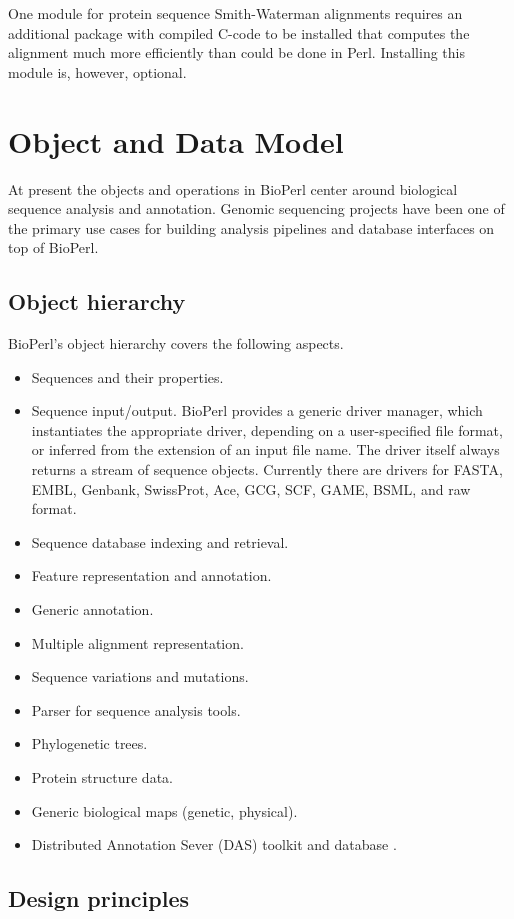 \documentclass{article}
\begin{document}
\begin{twocolumn}
One module for protein sequence Smith-Waterman alignments requires an
additional package with compiled C-code to be installed that computes
the alignment much more efficiently than could be done in
Perl.  Installing this module is, however, optional.

\section{Object and Data Model}

At present the objects and operations in BioPerl center around
biological sequence analysis and annotation.  Genomic sequencing
projects have been one of the primary use cases for building analysis
pipelines and database interfaces on top of BioPerl. 

\subsection{Object hierarchy}

BioPerl's object hierarchy covers the following aspects.
\begin{itemize}
\item Sequences and their properties.
\item Sequence input/output.  BioPerl provides a generic driver
manager, which instantiates the appropriate driver, depending on a
user-specified file format, or inferred from the extension of an input
file name.  The driver itself always returns a stream of sequence
objects.  Currently there are drivers for FASTA, EMBL, Genbank, SwissProt,
Ace, GCG, SCF, GAME, BSML, and raw format.
\item Sequence database indexing and retrieval. 
\item Feature representation and annotation.
\item Generic annotation.
\item Multiple alignment representation.
\item Sequence variations and mutations.
\item Parser for sequence analysis tools.
\item Phylogenetic trees.
\item Protein structure data.
\item Generic biological maps (genetic, physical).
\item Distributed Annotation Sever (DAS) toolkit and database \cite{das}.
\end{itemize}

\subsection{Design principles}


\end{twocolumn}
\end{document}
